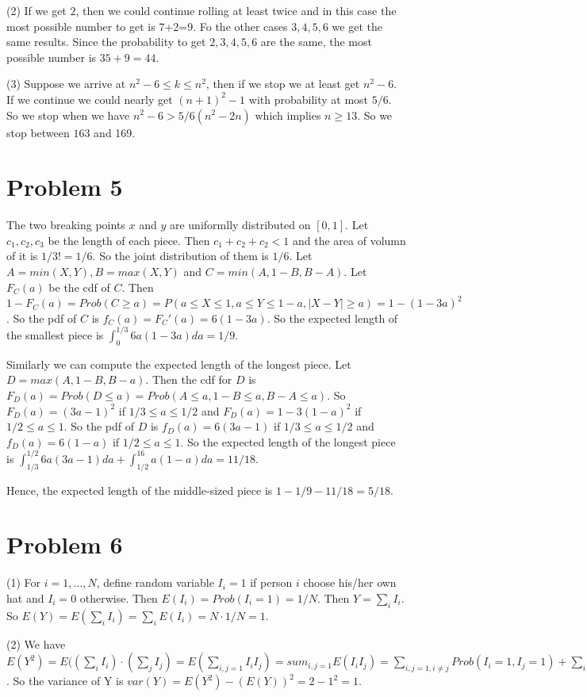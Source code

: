 \documentclass[12pt]{amsart}
\begin{document}
(2) If we get $2$, then we could continue rolling at least twice and in this case the most possible number to get is 7+2=9. Fo the other cases $3,4,5,6$ we get the same results. Since the probability to get $2,3,4,5,6$ are the same, the most possible number is $35+9=44$.

(3) Suppose we arrive at $n^2-6\leq k\leq n^2$, then if we stop we at least get $n^2-6$. If we continue we could nearly get $(n+1)^2-1$ with probability at most $5/6$. So we stop when we have $n^2-6>5/6(n^2-2n)$ which implies $n\geq 13$. So we stop between $163$ and 169. 

\section{Problem 5}
The two breaking points $x$ and $y$ are uniformlly distributed on $[0,1]$. Let $c_1,c_2,c_3$ be the length of each piece. Then $c_1+c_2+c_2<1$ and the area of volumn of it is $1/3!=1/6$. So the joint distribution of them is $1/6$. Let $A=min(X,Y), B=max(X,Y)$ and $C=min(A,1-B,B-A)$. Let $F_C(a)$ be the cdf of $C$. Then $1-F_C(a)=Prob(C\geq a) = P(a\leq X\leq 1,a\leq Y\leq 1-a,|X-Y|\geq a)=1-(1-3a)^2$. So the pdf of $C$ is $f_C(a)=F_C'(a)=6(1-3a)$. So the expected length of the smallest piece is $\int_0^{1/3}6a(1-3a)da=1/9$.

Similarly we can compute the expected length of the longest piece. Let $D=max(A,1-B,B-a)$. Then the cdf for $D$ is $F_D(a)=Prob(D\leq a)=Prob(A\leq a,1-B\leq a,B-A\leq a)$. So $F_D(a)=(3a-1)^2$ if $1/3\leq a\leq 1/2$ and $F_D(a)=1-3(1-a)^2$ if $1/2\leq a\leq 1$. So the pdf of $D$ is $f_D(a)=6(3a-1)$ if $1/3\leq a\leq 1/2$ and $f_D(a)=6(1-a)$ if $1/2\leq a\leq 1$. So the expected length of the longest piece is 
$\int_{1/3}^{1/2}6a(3a-1)da + \int_{1/2}^16a(1-a)da = 11/18$. 

Hence, the expected length of the middle-sized piece is $1-1/9-11/18=5/18$.

\section{Problem 6}
(1) For $i=1,...,N$, define random variable $I_i=1$ if person $i$ choose his/her own hat and $I_i=0$ otherwise. Then $E(I_i)=Prob(I_i=1)=1/N$. Then $Y=\sum_iI_i$. So $E(Y)=E(\sum_iI_i)=\sum_i E(I_i)=N\cdot 1/N=1$.

(2) We have $E(Y^2)=E((\sum_iI_i)\cdot (\sum_jI_j) =E(\sum_{i,j=1}I_iI_j)=sum_{i,j=1}E(I_iI_j)=\sum_{i,j=1,i\neq j}Prob(I_i=1,I_j=1)+\sum_iProb(I_i=1)=\sum_{i,j=1,i\neq j}\frac{1}{N(N-1)}+\sum_iProb(I_i=1)\frac{1}{N}=1+1=2$. So the variance of Y is $var(Y)=E(Y^2)-(E(Y))^2=2-1^2=1$.
\end{document}
